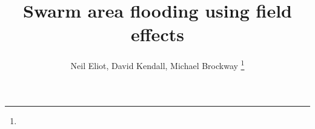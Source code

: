 \documentclass[10pt,journal,letterpaper,twoside]{IEEEtran}
\begin{document}
%
\title{Swarm area flooding using field effects}
%
%
%
%

\author{Neil Eliot, David Kendall, Michael Brockway
\thanks{}}

% 
%
\end{document}
